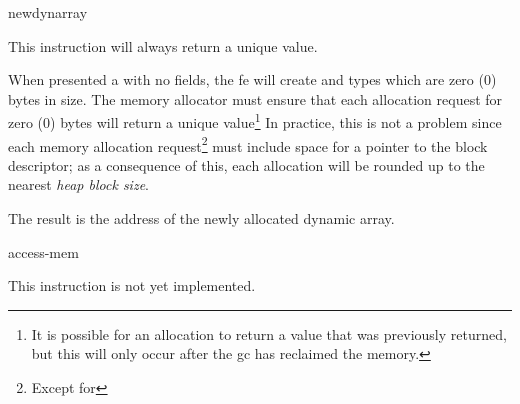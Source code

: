 \begin{instruction}{newdynarray}

  \begin{notes}
    This instruction will always return a unique value.  

    When presented a  with no fields, the \ac{fe} will
    create  and  types which are zero (0)
    bytes in size.  The memory allocator must ensure that each
    allocation request for zero (0) bytes will return a unique
    value\footnote{It is possible for an allocation to return a value
      that was previously returned, but this will only occur after the
      \ac{gc} has reclaimed the memory.}  In practice, this is not a
    problem since each memory allocation request\footnote{Except for
      } must include space for a pointer to the block
    descriptor; as a consequence of this, each allocation will be
    rounded up to the nearest \emph{heap block size}.
  \end{notes}

  \begin{results}
  \item The result is the address of the newly allocated dynamic
    array.
  \end{results}

  \begin{operands}
  \item {}
  \item {}
  \end{operands}
\end{instruction}

\begin{instruction}{access-mem}
  \begin{notes}
    This instruction is not yet implemented.
  \end{notes}
\end{instruction}

